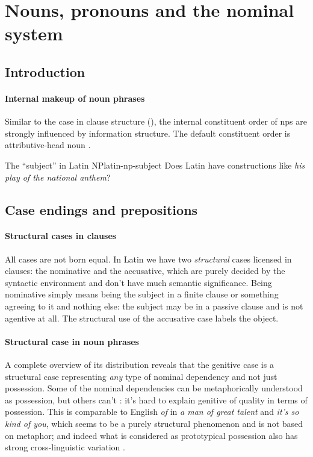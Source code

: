 \documentclass[a4paper, oneside, 12pt]{report}
\newcommand*{\citepage}[1]{p.~{#1}}
\newcommand*{\citepages}[1]{pp.~{#1}}
\newcommand{\form}[1]{\emph{#1}}
\begin{document}
\section{Nouns, pronouns and the nominal system}\label{sec:grammatical.np}

\subsection{Introduction}

\paragraph*{Internal makeup of noun phrases}
Similar to the case in clause structure (),
the internal constituent order of \acs{np}s are strongly influenced by 
information structure.
The default constituent order is attributive-head noun
\citep[\citepage{396}]{allen1903allen}.

\begin{todobox}{The ``subject'' in Latin NP}{latin-np-subject}
    Does Latin have constructions like \form{his play of the national anthem}?
\end{todobox}

\subsection{Case endings and prepositions}

\paragraph*{Structural cases in clauses}
All cases are not born equal. 
In Latin we have two \emph{structural} cases licensed in clauses: the nominative and the accusative,
which are purely decided by the syntactic environment 
and don't have much semantic significance.
Being nominative simply means being the subject in a finite clause or something agreeing to it 
and nothing else: 
the subject may be in a passive clause and is not agentive at all.
The structural use of the accusative case labels the object.

\paragraph*{Structural case in noun phrases}
A complete overview of its distribution reveals that 
the genitive case is a structural case 
representing \emph{any} type of nominal dependency 
and not just possession.
Some of the nominal dependencies can be 
metaphorically understood as possession, 
but others can't \citep[\citepage{244}]{oniga2014latin}:
it's hard to explain genitive of quality 
in terms of possession.
This is comparable to English \form{of}
in \form{a man of great talent} and \form{it's so kind of you},
which seems to be a purely structural phenomenon
and is not based on metaphor;
and indeed what is considered as prototypical possession 
also has strong cross-linguistic variation 
\citep[\citepages{262-263}]{dixon2010basic2}.
\end{document}
